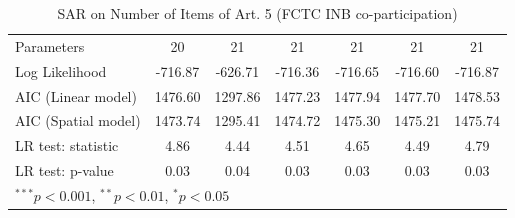 \begin{table}[!h]
\begin{center}
\begin{tabular}{l c c c c c c }
Parameters              & 20           & 21           & 21           & 21           & 21           & 21           \\
Log Likelihood          & -716.87      & -626.71      & -716.36      & -716.65      & -716.60      & -716.87      \\
AIC (Linear model)      & 1476.60      & 1297.86      & 1477.23      & 1477.94      & 1477.70      & 1478.53      \\
AIC (Spatial model)     & 1473.74      & 1295.41      & 1474.72      & 1475.30      & 1475.21      & 1475.74      \\
LR test: statistic      & 4.86         & 4.44         & 4.51         & 4.65         & 4.49         & 4.79         \\
LR test: p-value        & 0.03         & 0.04         & 0.03         & 0.03         & 0.03         & 0.03         \\
\bottomrule
\multicolumn{7}{l}{\scriptsize{$^{***}p<0.001$, $^{**}p<0.01$, $^*p<0.05$}}
\end{tabular}
\caption{SAR on Number of Items of Art. 5 (FCTC INB co-participation)}
\label{table:coefficients}
\end{center}
\end{table}
